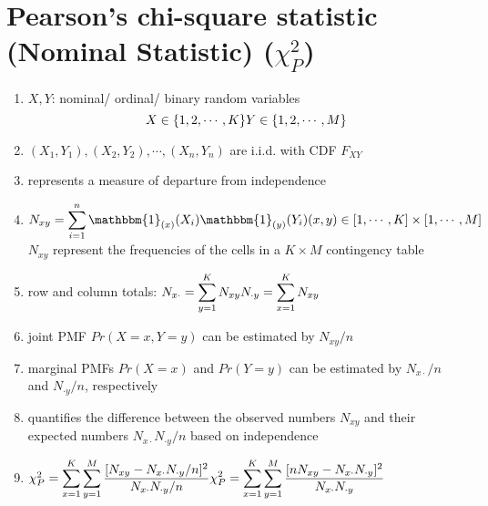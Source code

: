 \section{Pearson’s chi-square statistic (Nominal Statistic) ($\chi_P^2$) \cite{ism-1}} \label{Multivariate Distributions: Pearson’s chi-square statistic (Nominal Statistic)}

\begin{enumerate}
    \item[] $X, Y$: nominal/ ordinal/ binary random variables
    \[
        \hfill
        X \in \{1, 2,\cdots, K\}
        \hfill
        Y \in \{1, 2,\cdots, M\}
        \hfill
    \]

    \item[] $(X_1, Y_1), (X_2, Y_2), \cdots , (X_n, Y_n)$ are i.i.d. with CDF $F_{XY}$

    \item represents a measure of departure from independence

    \item $
        N_{xy}
        = \dsum_{i=1}^{n} 
        \mathbbm{1}_{(x)}(X_i)
        \mathbbm{1}_{(y)}(Y_i)
        \hfill
        (x,y) \in [1,\cdots,K] \times [1,\cdots,M]
    $\\
    $N_{xy}$ represent the frequencies of the cells in a $K \times M$ contingency table
    
    \item row and column totals: $
        \hfill
        N_{x\cdot} = \dsum_{y=1}^{K} N_{xy}
        \hfill
        N_{\cdot y} = \dsum_{x=1}^{K} N_{xy}
        \hfill
    $

    \item joint PMF $Pr(X = x, Y = y)$ can be estimated by $N_{xy}/n$

    \item marginal PMFs $Pr(X = x)$ and $Pr(Y = y)$ can be estimated by $N_{x\cdot}/n$ and $N_{\cdot y}/n$, respectively

    \item quantifies the difference between the observed numbers $N_{xy}$ and their expected numbers $N_{x\cdot}N_{\cdot y}/n$ based on independence

    \item $
        \hfill
        \chi_P^2 = \dsum_{x=1}^{K} \dsum_{y=1}^{M}
        \dfrac{[N_{xy} - N_{x\cdot}N_{\cdot y}/n]^2}{N_{x\cdot}N_{\cdot y}/n}
        \hfill
        \chi_P^2 = \dsum_{x=1}^{K} \dsum_{y=1}^{M}
        \dfrac{[nN_{xy} - N_{x\cdot}N_{\cdot y}]^2}{N_{x\cdot}N_{\cdot y}}
        \hfill
    $


\end{enumerate}
